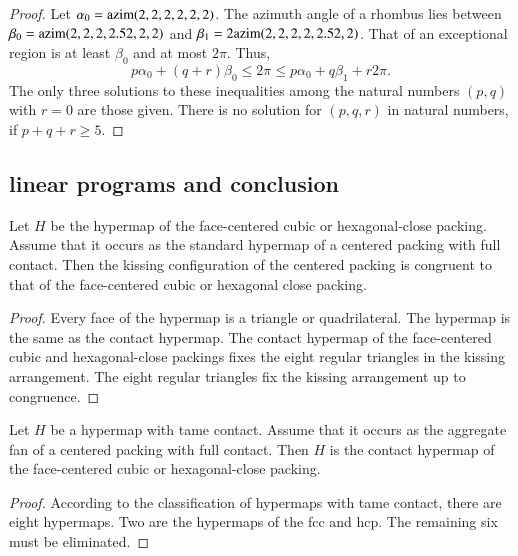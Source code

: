 \begin{proof} Let $\alpha_0 = {\operatorname{azim}}(2,2,2,2,2,2)$.  The azimuth angle of a rhombus lies between $\beta_0 = {\operatorname{azim}}(2,2,2,2.52,2,2)$ and
$\beta_1 = 2{\operatorname{azim}}(2,2,2,2,2.52,2)$.  That of an exceptional region is at least $\beta_0$ and at most $2\pi$.  Thus,
$$
p\alpha_0 + (q+r) \beta_0 \le 2\pi \le p\alpha_0 + q\beta_1 + r 2\pi.
$$
The only three solutions to these inequalities among the natural numbers $(p,q)$ with $r=0$ are those given. There is no solution for $(p,q,r)$ in natural numbers, if $p+q+r\ge 5$.
\end{proof}





\subsection{linear programs and conclusion}

\begin{lemma}\label{lemma:kiss-fcc} Let $H$ be the hypermap of the face-centered cubic or hexagonal-close packing.   Assume that it occurs as the standard hypermap of a centered packing with full contact.  Then the kissing configuration of the centered packing is congruent to that of the face-centered cubic or hexagonal close packing.
\end{lemma}

\begin{proof} Every face of the hypermap is a triangle or quadrilateral.  The  hypermap is the same as the contact hypermap.  The contact hypermap of the face-centered cubic and hexagonal-close packings fixes the eight regular triangles in the kissing arrangement.  The eight regular triangles fix the kissing arrangement up to congruence.
\end{proof}

\begin{lemma}\label{lemma:fcc-ft} Let $H$ be a hypermap with tame contact.  Assume that it occurs as the aggregate fan of a centered packing with full contact.  Then $H$ is the contact hypermap of the face-centered cubic or hexagonal-close packing.
\end{lemma}

\begin{proof} According to the classification of hypermaps with tame contact, there are eight hypermaps.  Two are the hypermaps of the fcc and hcp.  The remaining six must be eliminated.
\end{proof}

